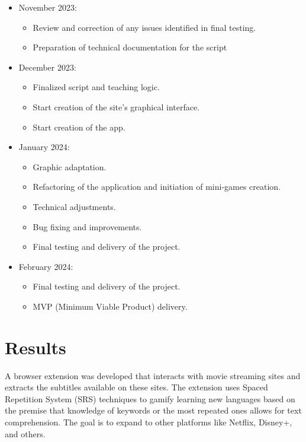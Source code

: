 \documentclass[12pt]{article}
\begin{document}
\begin{itemize}
\item November 2023:
\begin{itemize}
\item Review and correction of any issues identified in final testing.
\item Preparation of technical documentation for the script 
\end{itemize}

\item December 2023:
\begin{itemize}
\item Finalized script and teaching logic.
\item Start creation of the site's graphical interface.
\item Start creation of the app. 
\end{itemize}

\item January 2024:
\begin {itemize}
\item Graphic adaptation.
\item Refactoring of the application and initiation of mini-games creation.
\item Technical adjustments.
\item Bug fixing and improvements.
\item Final testing and delivery of the project.
\end {itemize}

\item February 2024:
\begin {itemize}
\item Final testing and delivery of the project.
\item MVP (Minimum Viable Product) delivery.
\end {itemize}

\end{itemize}
\section{Results}


A browser extension was developed that interacts with movie streaming sites and extracts the subtitles available on these sites. The extension uses Spaced Repetition System (SRS) techniques to gamify learning new languages based on the premise that knowledge of keywords or the most repeated ones allows for text comprehension. The goal is to expand to other platforms like Netflix, Disney+, and others.
\end{document}
